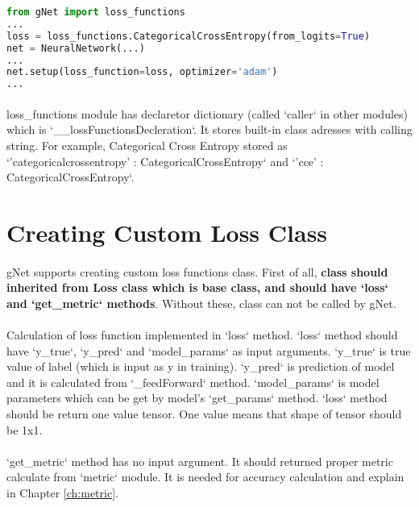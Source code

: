 \documentclass[12pt]{report}
\begin{document}
\begin{lstlisting}[language=Python, numbers=none, caption={Built-in loss function with custom parameters.}, label={lis:loss-built-in-custom-params}]
from gNet import loss_functions
...
loss = loss_functions.CategoricalCrossEntropy(from_logits=True)
net = NeuralNetwork(...)
...
net.setup(loss_function=loss, optimizer='adam')
...
\end{lstlisting}

\paragraph{}
loss\_functions module has declaretor dictionary (called `caller` in other modules) which is `\_\_lossFunctionsDecleration`. It stores built-in class adresses with calling string. For example, Categorical Cross Entropy stored as `'categoricalcrossentropy' : CategoricalCrossEntropy` and `'cce' : CategoricalCrossEntropy`.

\section{Creating Custom Loss Class}

\paragraph{}
gNet supports creating custom loss functions class. First of all, \textbf{class should inherited from Loss class which is base class, and should have `loss` and `get\_metric` methods}. Without these, class can not be called by gNet. 

\paragraph{}
Calculation of loss function implemented in `loss` method. `loss` method should have `y\_true`, `y\_pred` and `model\_params` as input arguments. `y\_true` is true value of label (which is input as y in training). `y\_pred` is prediction of model and it is calculated from `\_feedForward` method. `model\_params` is model parameters which can be get by model's `get\_params` method. `loss` method should be return one value tensor. One value means that shape of tensor should be 1x1.  

\paragraph{}
`get\_metric` method has no input argument. It should returned proper metric calculate from `metric` module. It is needed for accuracy calculation and explain in Chapter \ref{ch:metric}.
\end{document}
